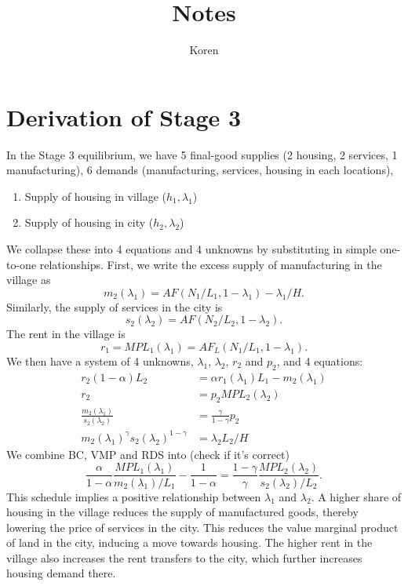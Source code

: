 \documentclass[letter]{amsart}
\theoremstyle{definition}
\theoremstyle{remark}
\numberwithin{equation}{section}
\begin{document}
\title{Notes}%
\author{Koren}%

\section{Derivation of Stage 3}
In the Stage 3 equilibrium, we have 5 final-good supplies (2 housing, 2 services, 1 manufacturing), 6 demands (manufacturing, services, housing in each locations),

\begin{enumerate}
  \item Supply of housing in village ($h_1,\lambda_1$)
  \item Supply of housing in city ($h_2,\lambda_2$)
\end{enumerate}

We collapse these into 4 equations and 4 unknowns by substituting in simple one-to-one relationships. First, we write the excess supply of manufacturing in the village as
\[
m_2(\lambda_1) = AF(N_1/L_1,1-\lambda_1) - \lambda_1/H.
\]
Similarly, the supply of services in the city is
\[
s_2(\lambda_2) = AF(N_2/L_2,1-\lambda_2).
\]
The rent in the village is
\[
r_1 = MPL_1(\lambda_1) = AF_L(N_1/L_1,1-\lambda_1).
\]
We then have a system of 4 unknowns, $\lambda_1$, $\lambda_2$, $r_2$ and $p_2$, and 4 equations:
\begin{align}
r_2(1-\alpha)L_2 &= \alpha r_1(\lambda_1) L_1 - m_2(\lambda_1) \tag{budget constraint}\\
r_2              &= p_2 MPL_2(\lambda_2) \tag{value marginal product}\\
\frac{m_2(\lambda_1)}{s_2(\lambda_2)} &= \frac{\gamma}{1-\gamma}p_2 \tag{relative demand of services}\\
m_2(\lambda_1)^\gamma s_2(\lambda_2)^{1-\gamma} &= \lambda_2 L_2/H \tag{relative demand of housing}
\end{align}
We combine BC, VMP and RDS into (check if it's correct)
\begin{equation}
\frac{\alpha}{1-\alpha}\frac{MPL_1(\lambda_1)}{m_2(\lambda_1)/L_1} - \frac{1}{1-\alpha} = \frac{1-\gamma}{\gamma} \frac{MPL_2(\lambda_2)}{s_2(\lambda_2)/L_2}.
\end{equation}
This schedule implies a positive relationship between $\lambda_1$ and $\lambda_2$. A higher share of housing in the village reduces the supply of manufactured goods, thereby lowering the price of services in the city. This reduces the value marginal product of land in the city, inducing a move towards housing. The higher rent in the village also increases the rent transfers to the city, which further increases housing demand there.
\end{document}
